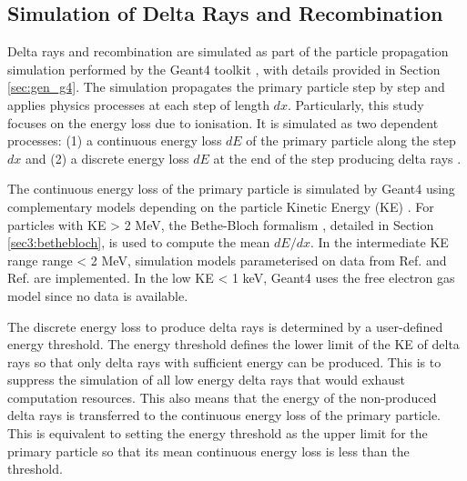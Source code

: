 
\subsection{Simulation of Delta Rays and Recombination}
\label{sec:simDeltaRay}

Delta rays and recombination are simulated as part of the particle propagation simulation performed by the Geant4 toolkit \cite{geant4}, with details provided in Section \ref{sec:gen_g4}.
The simulation propagates the primary particle step by step and applies physics processes at each step of length $dx$.
Particularly, this study focuses on the energy loss due to ionisation.
It is simulated as two dependent processes: (1) a continuous energy loss $dE$ of the primary particle along the step $dx$ and (2) a discrete energy loss $dE$ at the end of the step producing delta rays \cite{geant4}.

The continuous energy loss of the primary particle is simulated by Geant4 using complementary models depending on the particle Kinetic Energy (KE) \cite{geant4_ions}.
For particles with KE > 2 MeV, the Bethe-Bloch formalism \cite{Passage}, detailed in Section \ref{sec3:bethebloch}, is used to compute the mean $dE/dx$.
In the intermediate KE range range < 2 MeV, simulation models parameterised on data from Ref. \cite{Ziegler} and Ref. \cite{ICRU} are implemented.
In the low KE < 1 keV, Geant4 uses the free electron gas model since no data is available.

The discrete energy loss to produce delta rays is determined by a user-defined energy threshold.
The energy threshold defines the lower limit of the KE of delta rays so that only delta rays with sufficient energy can be produced.
This is to suppress the simulation of all low energy delta rays that would exhaust computation resources.
This also means that the energy of the non-produced delta rays is transferred to the continuous energy loss of the primary particle.
This is equivalent to setting the energy threshold as the upper limit for the primary particle so that its mean continuous energy loss is less than the threshold.

